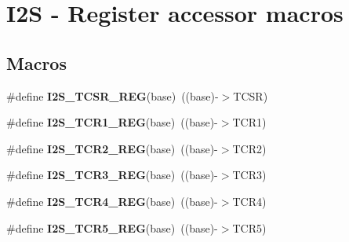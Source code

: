 \hypertarget{group__I2S__Register__Accessor__Macros}{}\section{I2S -\/ Register accessor macros}
\label{group__I2S__Register__Accessor__Macros}
\subsection*{Macros}
\begin{DoxyCompactItemize}
\item 
\#define {\bfseries I2\+S\+\_\+\+T\+C\+S\+R\+\_\+\+R\+EG}(base)~((base)-\/$>$T\+C\+SR)\hypertarget{group__I2S__Register__Accessor__Macros_gad63655c7251e2ddde723c6a4f7d595a4}{}\label{group__I2S__Register__Accessor__Macros_gad63655c7251e2ddde723c6a4f7d595a4}

\item 
\#define {\bfseries I2\+S\+\_\+\+T\+C\+R1\+\_\+\+R\+EG}(base)~((base)-\/$>$T\+C\+R1)\hypertarget{group__I2S__Register__Accessor__Macros_ga15b221ae8f999ce7dd132e42d9a8e898}{}\label{group__I2S__Register__Accessor__Macros_ga15b221ae8f999ce7dd132e42d9a8e898}

\item 
\#define {\bfseries I2\+S\+\_\+\+T\+C\+R2\+\_\+\+R\+EG}(base)~((base)-\/$>$T\+C\+R2)\hypertarget{group__I2S__Register__Accessor__Macros_ga078d8dfc2a79cc117a21465f60d37918}{}\label{group__I2S__Register__Accessor__Macros_ga078d8dfc2a79cc117a21465f60d37918}

\item 
\#define {\bfseries I2\+S\+\_\+\+T\+C\+R3\+\_\+\+R\+EG}(base)~((base)-\/$>$T\+C\+R3)\hypertarget{group__I2S__Register__Accessor__Macros_ga20ca4a7340fc7ac9a14c313d2b0c0392}{}\label{group__I2S__Register__Accessor__Macros_ga20ca4a7340fc7ac9a14c313d2b0c0392}

\item 
\#define {\bfseries I2\+S\+\_\+\+T\+C\+R4\+\_\+\+R\+EG}(base)~((base)-\/$>$T\+C\+R4)\hypertarget{group__I2S__Register__Accessor__Macros_gab20e23ff9fad28fd3dfde2110061289e}{}\label{group__I2S__Register__Accessor__Macros_gab20e23ff9fad28fd3dfde2110061289e}

\item 
\#define {\bfseries I2\+S\+\_\+\+T\+C\+R5\+\_\+\+R\+EG}(base)~((base)-\/$>$T\+C\+R5)\hypertarget{group__I2S__Register__Accessor__Macros_ga4ac04958932172b137ecb3eaca03cda0}{}\label{group__I2S__Register__Accessor__Macros_ga4ac04958932172b137ecb3eaca03cda0}


\end{DoxyCompactItemize}
